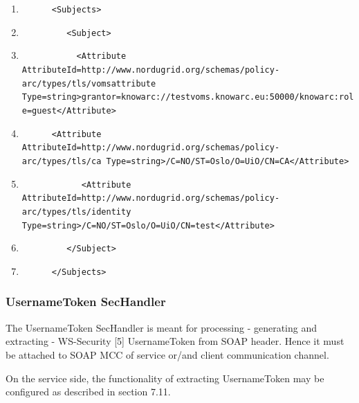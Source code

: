 \documentclass{article}
\newcommand\liststyleWWviiiNumxxiv{%
\renewcommand\theenumi{\arabic{enumi}}
\renewcommand\theenumii{\arabic{enumii}}
\renewcommand\theenumiii{\arabic{enumiii}}
\renewcommand\theenumiv{\arabic{enumiv}}
\renewcommand\labelenumi{\theenumi.}
\renewcommand\labelenumii{\theenumii.}
\renewcommand\labelenumiii{\theenumiii.}
\renewcommand\labelenumiv{\theenumiv.}
}
\begin{document}
\liststyleWWviiiNumxxiv
\begin{enumerate}
\item {\color{black}
\texttt{\ \ \ \ \ \ {\textless}Subjects{\textgreater}}}
\item {\color{black}
\texttt{\ \ \ \ \ \ \ \ \ {\textless}Subject{\textgreater}}}
\item {\color{black}
\texttt{\ \ \ \ \ \ \ \ \ \ \ {\textless}Attribute
AttributeId={\textquotedbl}http://www.nordugrid.org/schemas/policy-arc/types/tls/vomsattribute{\textquotedbl}
Type={\textquotedbl}string{\textquotedbl}{\textgreater}grantor=knowarc://testvoms.knowarc.eu:50000/knowarc:role=guest{\textless}/Attribute{\textgreater}}}
\item {\color{black}
\texttt{\ \ \ \ \ \ {\textless}Attribute
AttributeId={\textquotedbl}http://www.nordugrid.org/schemas/policy-arc/types/tls/ca{\textquotedbl}
Type={\textquotedbl}string{\textquotedbl}{\textgreater}/C=NO/ST=Oslo/O=UiO/CN=CA{\textless}/Attribute{\textgreater}}}
\item {\color{black}
\texttt{\ \ \ \ \ \ \ \ \ \ \ \ {\textless}Attribute
AttributeId={\textquotedbl}http://www.nordugrid.org/schemas/policy-arc/types/tls/identity{\textquotedbl}
Type={\textquotedbl}string{\textquotedbl}{\textgreater}/C=NO/ST=Oslo/O=UiO/CN=test{\textless}/Attribute{\textgreater}}}
\item {\color{black}
\texttt{\ \ \ \ \ \ \ \ \ {\textless}/Subject{\textgreater}}}
\item {\color{black}
\texttt{\ \ \ \ \ \ {\textless}/Subjects{\textgreater}}}
\end{enumerate}

\bigskip

\subsubsection[UsernameToken SecHandler]{UsernameToken SecHandler}
{\color{black}
The UsernameToken SecHandler is meant for processing - generating and
extracting - WS-Security [5] UsernameToken from SOAP header. Hence it
must be attached to SOAP MCC of service or/and client communication
channel. }

{\upshape\color{black}
On the service side, the functionality of extracting UsernameToken may
be configured as described in section 7.11. }
\end{document}
